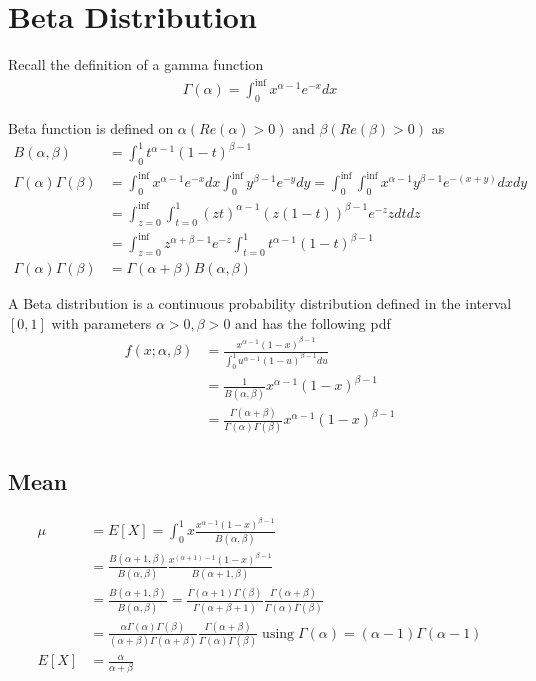 \documentclass[../../probability-notes.tex]{subfiles}
\begin{document}
    \section{Beta Distribution}
    Recall the definition of a gamma function
    \begin{align*}
        \Gamma(\alpha) = \int_{0}^{\inf} x^{\alpha - 1}e^{-x}dx
    \end{align*}

    Beta function is defined on $\alpha (Re(\alpha) > 0)$ and $\beta (Re(\beta) > 0)$ as
    \begin{align*}
        B(\alpha, \beta) &= \int_{0}^{1} t^{\alpha-1} (1-t)^{\beta - 1}\\
        \Gamma(\alpha)\Gamma(\beta) &= \int_{0}^{\inf} x^{\alpha - 1}e^{-x}dx \int_{0}^{\inf} y^{\beta - 1}e^{-y}dy = \int_{0}^{\inf}\int_{0}^{\inf}x^{\alpha - 1}y^{\beta - 1}e^{-(x+y)} dxdy\\
        &= \int_{z=0}^{\inf}\int_{t=0}^{1} (zt)^{\alpha - 1} (z(1-t))^{\beta - 1} e^{-z} zdtdz\\
        &= \int_{z=0}^{\inf} z^{\alpha + \beta - 1} e^{-z} \int_{t=0}^{1} t^{\alpha - 1} (1-t)^{\beta - 1}\\
        \Gamma(\alpha)\Gamma(\beta) &= \Gamma(\alpha+\beta) B(\alpha, \beta)
    \end{align*}

    A Beta distribution is a continuous probability distribution defined in the interval $[0,1]$ with parameters $\alpha >0, \beta >0$ and has the following pdf
    \begin{align*}
        f(x;\alpha, \beta) &= \frac{x^{\alpha - 1}(1-x)^{\beta - 1}}{\int_{0}^{1} u^{\alpha - 1}(1-u)^{\beta - 1} du}\\
        &= \frac{1}{B(\alpha, \beta)} x^{\alpha - 1}(1-x)^{\beta - 1}\\
        &= \frac{\Gamma(\alpha+\beta)}{\Gamma(\alpha)\Gamma(\beta)} x^{\alpha - 1}(1-x)^{\beta - 1}
    \end{align*}

    \subsection{Mean}
    \begin{align*}
        \mu &= E[X] = \int_{0}^{1} x \frac{x^{\alpha - 1}(1-x)^{\beta - 1}}{B(\alpha, \beta)}\\
        &= \frac{B(\alpha+1, \beta)}{B(\alpha, \beta)} \frac{x^{(\alpha + 1)-1}(1-x)^{\beta - 1}}{B(\alpha+1, \beta)}\\
        &= \frac{B(\alpha+1, \beta)}{B(\alpha, \beta)} = \frac{\Gamma(\alpha+1)\Gamma(\beta)}{\Gamma(\alpha+\beta+1)} \frac{\Gamma(\alpha+\beta)}{\Gamma(\alpha)\Gamma(\beta)}\\
        &= \frac{\alpha \Gamma(\alpha) \Gamma(\beta)}{(\alpha+\beta)\Gamma(\alpha+\beta)}  \frac{\Gamma(\alpha+\beta)}{\Gamma(\alpha)\Gamma(\beta)} \; \text{using}\; \Gamma(\alpha)=(\alpha - 1) \Gamma (\alpha - 1)\\
        E[X] &= \frac{\alpha}{\alpha + \beta}
    \end{align*}
\end{document}
